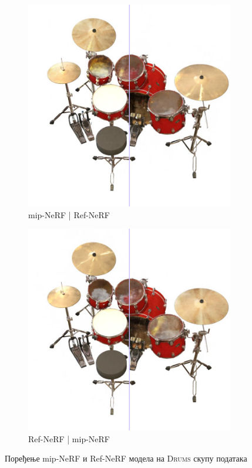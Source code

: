 \documentclass[12pt, a4paper, twoside]{book}
\numberwithin{equation}{chapter}
\numberwithin{theorem}{section}
\numberwithin{definition}{section}
\numberwithin{definitionChapter}{chapter}
\begin{document}
	\begin{figure}[H]
		\centering
		\begin{subfigure}{0.475\textwidth}
			\centering
			\includegraphics[scale=0.25]{img/comparison/mipnerf_vs_refnerf_drums_3.png}
			\caption{mip-NeRF | Ref-NeRF}
		\end{subfigure}
		\begin{subfigure}{0.475\textwidth}
			\centering
			\includegraphics[scale=0.25]{img/comparison/refnerf_vs_mipnerf_drums_3.png}
			\caption{Ref-NeRF | mip-NeRF}
		\end{subfigure}
		\caption{Поређење mip-NeRF и Ref-NeRF модела на \textsc{Drums} скупу података}
		\label{fig-drums-comparison}
	\end{figure}
\end{document}
